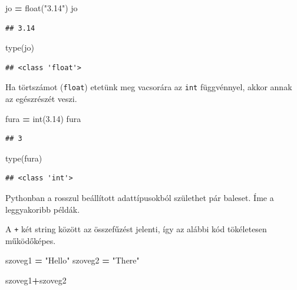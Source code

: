 \documentclass[
]{book}
\newenvironment{Shaded}{\begin{snugshade}}{\end{snugshade}}
\newcommand{\BuiltInTok}[1]{#1}
\newcommand{\FloatTok}[1]{\textcolor[rgb]{0.00,0.00,0.81}{#1}}
\newcommand{\NormalTok}[1]{#1}
\newcommand{\OperatorTok}[1]{\textcolor[rgb]{0.81,0.36,0.00}{\textbf{#1}}}
\newcommand{\StringTok}[1]{\textcolor[rgb]{0.31,0.60,0.02}{#1}}
\begin{document}
\begin{Shaded}
\begin{Highlighting}[]
\NormalTok{jo }\OperatorTok{=} \BuiltInTok{float}\NormalTok{(}\StringTok{"3.14"}\NormalTok{)}
\NormalTok{jo}
\end{Highlighting}
\end{Shaded}

\begin{verbatim}
## 3.14
\end{verbatim}

\begin{Shaded}
\begin{Highlighting}[]
\BuiltInTok{type}\NormalTok{(jo)}
\end{Highlighting}
\end{Shaded}

\begin{verbatim}
## <class 'float'>
\end{verbatim}

Ha törtszámot (\texttt{float}) etetünk meg vacsorára az \texttt{int} függvénnyel, akkor annak az egészrészét veszi.

\begin{Shaded}
\begin{Highlighting}[]
\NormalTok{fura }\OperatorTok{=} \BuiltInTok{int}\NormalTok{(}\FloatTok{3.14}\NormalTok{)}
\NormalTok{fura}
\end{Highlighting}
\end{Shaded}

\begin{verbatim}
## 3
\end{verbatim}

\begin{Shaded}
\begin{Highlighting}[]
\BuiltInTok{type}\NormalTok{(fura)}
\end{Highlighting}
\end{Shaded}

\begin{verbatim}
## <class 'int'>
\end{verbatim}

Pythonban a rosszul beállított adattípusokból születhet pár baleset. Íme a leggyakoribb példák.

A \texttt{+} két string között az összefűzést jelenti, így az alábbi kód tökéletesen működőképes.

\begin{Shaded}
\begin{Highlighting}[]
\NormalTok{szoveg1 }\OperatorTok{=} \StringTok{"Hello"}
\NormalTok{szoveg2 }\OperatorTok{=} \StringTok{"There"}

\NormalTok{szoveg1}\OperatorTok{+}\NormalTok{szoveg2}
\end{Highlighting}
\end{Shaded}
\end{document}

